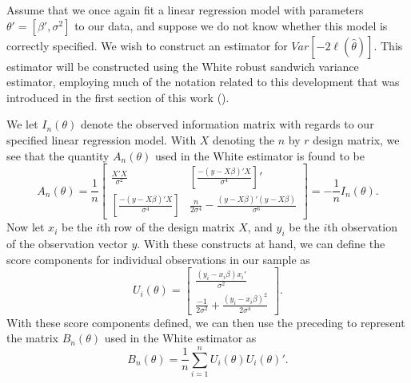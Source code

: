 \documentclass[12pt]{article} %
\theoremstyle{definition}
\begin{document}
		Assume that we once again fit a linear regression model with parameters $\theta' = [\beta', \sigma^2]$ to our data, and suppose we do not know whether this model is correctly specified.
		We wish to construct an estimator for $Var \left[ -2 \ell (\hat{\theta}  ) \right]$. This estimator will be constructed using the White robust sandwich variance estimator, employing
		much of the notation related to this development that was introduced in the first section of this work (\cite{White1980}).

		We let $I_{n} (\theta)$ denote the observed information matrix with regards to our specified linear regression model. With $X$ denoting the $n$ by $r$ design matrix, we see that
		the quantity $A_n (\theta)$ used in the White estimator is found to be 
		\begin{equation*}
			A_n(\theta) = \frac{1}{n}
			\begin{bmatrix}
				\frac{X'X}{\sigma^2} & \left[ \frac{-(y-X\beta)'X}{\sigma^4} \right]' \\
				\left[ \frac{-(y-X\beta)'X}{\sigma^4} \right] &  \frac{n}{2 \sigma^4} - \frac{(y-X\beta)'(y-X\beta)}{\sigma^6}
				\end{bmatrix}
				= -\frac{1}{n} I_n(\theta) .
		\end{equation*}
		Now let $x_i$ be the $i$th row of the design matrix $X$, and $y_i$ be the $i$th observation of the observation vector $y$. With these constructs at hand, we can define the score components
		for individual observations in our sample as
		\begin{equation*}
			U_i(\theta) = 
			\begin{bmatrix}
				\frac{(y_i-x_i \beta)x_i'}{\sigma^2} \\
				\frac{-1}{2 \sigma^2} + \frac{(y_i - x_i \beta)^2}{2 \sigma^4}
			\end{bmatrix}
			.
		\end{equation*}
		With these score components defined, we can then use the preceding to represent the matrix $B_n (\theta)$ used in the White estimator as
		\begin{equation*}
			B_n(\theta) = \frac{1}{n} \sum_{i=1}^{n} U_i(\theta) U_i(\theta)' .
		\end{equation*}
\end{document}
